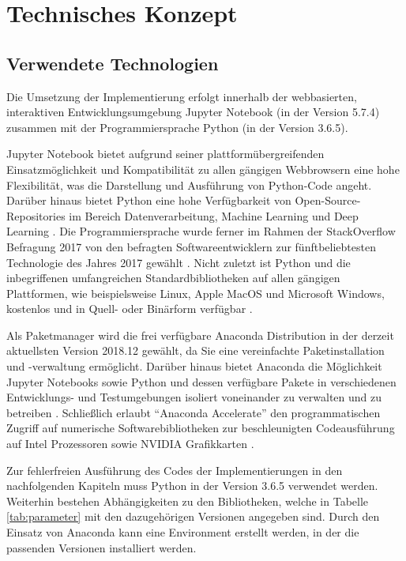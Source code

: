 \chapter{Technisches Konzept}
\label{cha:TechKonzept}
\section{Verwendete Technologien}
Die Umsetzung der Implementierung erfolgt innerhalb der webbasierten, interaktiven Entwicklungsumgebung Jupyter Notebook \cite{noauthor_project_nodate} (in der Version 5.7.4) zusammen mit der Programmiersprache Python \cite{noauthor_what_nodate} (in der Version 3.6.5).


Jupyter Notebook bietet aufgrund seiner plattformübergreifenden Einsatzmöglichkeit und Kompatibilität zu allen gängigen Webbrowsern eine hohe Flexibilität, was die Darstellung und Ausführung von Python-Code angeht. 
Darüber hinaus bietet Python eine hohe Verfügbarkeit von Open-Source-Repositories im Bereich Datenverarbeitung, Machine Learning und Deep Learning \cite{india_why_2018}. 
Die Programmiersprache wurde ferner im Rahmen der StackOverflow Befragung 2017 von den befragten Softwareentwicklern zur fünftbeliebtesten Technologie des Jahres 2017 gewählt \cite{noauthor_stack_nodate}. 
Nicht zuletzt ist Python und die inbegriffenen umfangreichen Standardbibliotheken auf allen gängigen Plattformen, wie beispielsweise Linux, Apple MacOS und Microsoft Windows, kostenlos und in Quell- oder Binärform verfügbar \cite{noauthor_what_nodate}.


Als Paketmanager wird die frei verfügbare Anaconda Distribution in der derzeit aktuellsten Version 2018.12 gewählt, da Sie eine vereinfachte Paketinstallation und -verwaltung ermöglicht. 
Darüber hinaus bietet Anaconda die Möglichkeit Jupyter Notebooks sowie Python und dessen verfügbare Pakete in verschiedenen Entwicklungs- und Testumgebungen isoliert voneinander zu verwalten und zu betreiben \cite{noauthor_managing_nodate}.
Schließlich erlaubt "`Anaconda Accelerate"' den programmatischen Zugriff auf numerische Softwarebibliotheken zur beschleunigten Codeausführung auf Intel Prozessoren sowie NVIDIA Grafikkarten \cite{noauthor_anaconda_nodate}.


Zur fehlerfreien Ausführung des Codes der Implementierungen in den nachfolgenden Kapiteln muss Python in der Version 3.6.5 verwendet werden. 
Weiterhin bestehen Abhängigkeiten zu den Bibliotheken, welche in Tabelle \ref{tab:parameter} mit den dazugehörigen Versionen angegeben sind. 
Durch den Einsatz von Anaconda kann eine Environment erstellt werden, in der die passenden Versionen installiert werden.



